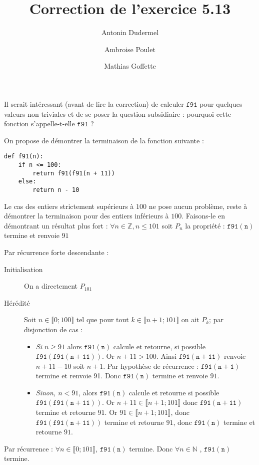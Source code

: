 \documentclass[11pt,a4paper]{article}
\title{Correction de l'exercice 5.13}
\date{}
\author{Antonin Dudermel \and Ambroise Poulet \and Mathias Goffette}
\begin{document}

\maketitle

\begin{it}
Il serait intéressant (avant de lire la correction) de calculer \;$\mathtt{f91}$ pour quelques valeurs non-triviales et de se poser la question subsidiaire : pourquoi cette fonction s'appelle-t-elle \;$\mathtt{f91}$ ?
\end{it}
\par
On propose de démontrer la terminaison de la fonction suivante :

\begin{lstlisting}
def f91(n):
    if n <= 100:
        return f91(f91(n + 11))
    else:
        return n - 10
\end{lstlisting}

\par
Le cas des entiers strictement supérieurs à $100$ ne pose aucun problème, reste à démontrer la terminaison pour des entiers inférieurs à $100$.
Faisons-le en démontrant un résultat plus fort : $\forall n \in \mathbb{Z}, n\leq 101$ soit $P_n$ la propriété : \og{} $\mathtt{f91(n)}$ termine et renvoie $91$ \fg{}
\par
Par récurrence forte descendante :\\
\begin{description}
\item[Initialisation] \quad On a directement $P_{101}$
\item[Hérédité] \quad Soit $n\in \llbracket 0;100\rrbracket$ tel que pour tout $ k \in \llbracket n+1;101\rrbracket$ on ait $P_{k}$; par disjonction de cas : 
\begin{itemize}[\textbullet]
	\item {\itshape Si $n\geqslant 91$ } alors $\mathtt{f91(n)}$ calcule et retourne, si possible $\mathtt{f91(f91(n+11))}$. Or $n+11 > 100$. Ainsi $\mathtt{f91(n+11)}$ renvoie $n+11-10$ soit $n+1$. Par hypothèse de récurrence : $\mathtt{f91(n+1)}$ termine et renvoie 91. Donc $\mathtt{f91(n)}$ termine et renvoie $91$.
	\item {\itshape Sinon, $n < 91$}, alors $\mathtt{f91(n)}$ calcule et retourne si possible $\mathtt{f91(f91(n+11))}$. Or $n+11\in \llbracket n+1;101 \rrbracket$ donc $\mathtt{f91(n+11)}$ termine et retourne $91$. Or $91 \in \llbracket n+1;101 \rrbracket$, donc $\mathtt{f91(f91(n+11))}$ termine et retourne $91$, donc $\mathtt{f91(n)}$ termine et retourne $91$.
\end{itemize}
\end{description}
Par récurrence : $\forall n \in \llbracket 0;101 \rrbracket$, $\mathtt{f91(n)}$ termine.
Donc $\forall n \in \mathbb{N}$ , $\mathtt{f91(n)}$ termine.
\end{document}

